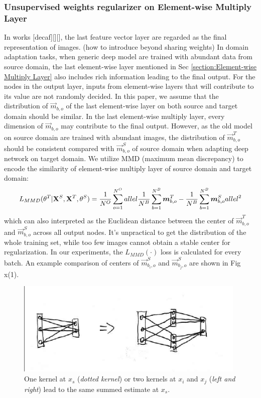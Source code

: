 \documentclass[runningheads]{llncs}
\begin{document}
\subsubsection{Unsupervised weights regularizer on Element-wise Multiply Layer}
In works [decaf][][], the last feature vector layer are regarded as the final representation of images. (how to introduce beyond sharing weights) In domain adaptation tasks, when generic deep model are trained with abundant data from source domain, the last element-wise layer mentioned in Sec \ref{section:Element-wise Multiply Layer} also includes rich information leading to the final output. For the nodes in the output layer, inputs from element-wise layers that will contribute to its value are not randomly decided. In this paper, we assume that the distribution of $\vec{m}_{b,o}$ of the last element-wise layer on both source and target domain should be similar. In the last element-wise multiply layer, every dimension of $\vec{m}_{b,o}$ may contribute to the final output. However, as the old model on source domain are trained with abundant images, the distribution of $\vec{m}^{T}_{b,o}$ should be consistent compared with $\vec{m}^{S}_{b,o}$ of source domain when adapting deep network on target domain. We utilize MMD (maximum mean discrepancy) to encode the similarity of element-wise multiply layer of source domain and target domain:
\begin{equation}\label{equation:LMMD}
  L_{MMD}(\theta^{T}|{\bf X}^{S},{\bf X}^{T},\theta^{S}) = \frac{1}{N^{O}} \sum^{N^{O}}_{o=1}{allel \frac{1}{N^{B}}\sum^{N^{B}}_{b=1}{\vec{m}^{T}_{b,o}} - \frac{1}{N^{B}}\sum^{N^{B}}_{b=1}{\vec{m}^{S}_{b,o}} {allel}^{2}  }
\end{equation}
which can also interpreted as the Euclidean distance between the center of $\vec{m}^{T}_{b,o}$ and $\vec{m}^{S}_{b,o}$ across all output nodes. It's unpractical to get the distribution of the whole training set, while too few images cannot obtain a stable center for regularization. In our experiments, the $L_{MMD}(\cdot)$ loss is calculated for every batch. An example comparison of centers of $\vec{m}^{S}_{b_{i},o}$ and $\vec{m}^{S}_{b_{j},o}$ are shown in Fig x(1).

\begin{figure}
\centering
\includegraphics[height=4.5cm]{images/fullconnectlayers.png}
\caption{One kernel at $x_s$ ({\it dotted kernel}) or two kernels at
$x_i$ and $x_j$ ({\it left and right}) lead to the same summed estimate
at $x_s$. }
\label{fig:example}
\end{figure}
\end{document}

